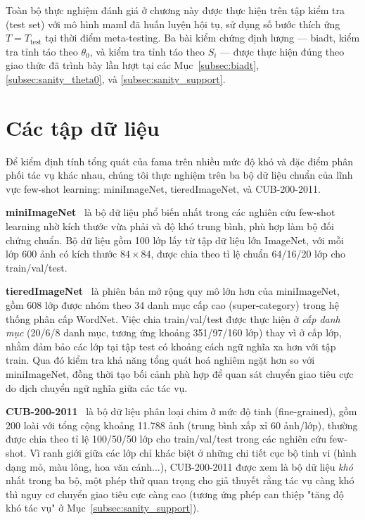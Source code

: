 Toàn bộ thực nghiệm đánh giá ở chương này được thực hiện trên tập kiểm tra (test set) với mô hình \acrshort{maml} đã huấn luyện hội tụ, sử dụng số bước thích ứng $T = T_{\text{test}}$ tại thời điểm meta-testing. Ba bài kiểm chứng định lượng — \acrshort{biadt}, kiểm tra tỉnh táo theo $\theta_0$, và kiểm tra tỉnh táo theo $S_i$ — được thực hiện đúng theo giao thức đã trình bày lần lượt tại các Mục~\ref{subsec:biadt}, \ref{subsec:sanity_theta0}, và \ref{subsec:sanity_support}.

\section{Các tập dữ liệu}
\label{sec:datasets}

Để kiểm định tính tổng quát của \acrshort{fama} trên nhiều mức độ khó và đặc điểm phân phối tác vụ khác nhau, chúng tôi thực nghiệm trên ba bộ dữ liệu chuẩn của lĩnh vực few-shot learning: miniImageNet, tieredImageNet, và CUB-200-2011.

\textbf{miniImageNet}~\cite{ravi2017optimization} là bộ dữ liệu phổ biến nhất trong các nghiên cứu few-shot learning nhờ kích thước vừa phải và độ khó trung bình, phù hợp làm bộ đối chứng chuẩn. Bộ dữ liệu gồm 100 lớp lấy từ tập dữ liệu lớn ImageNet, với mỗi lớp 600 ảnh có kích thước $84\times84$, được chia theo tỉ lệ chuẩn 64/16/20 lớp cho train/val/test.

\textbf{tieredImageNet}~\cite{ren2018meta} là phiên bản mở rộng quy mô lớn hơn của miniImageNet, gồm 608 lớp được nhóm theo 34 danh mục cấp cao (super-category) trong hệ thống phân cấp WordNet. Việc chia train/val/test được thực hiện ở \emph{cấp danh mục} (20/6/8 danh mục, tương ứng khoảng 351/97/160 lớp) thay vì ở cấp lớp, nhằm đảm bảo các lớp tại tập test có khoảng cách ngữ nghĩa xa hơn với tập train. Qua đó kiểm tra khả năng tổng quát hoá nghiêm ngặt hơn so với miniImageNet, đồng thời tạo bối cảnh phù hợp để quan sát chuyển giao tiêu cực do dịch chuyển ngữ nghĩa giữa các tác vụ.

\textbf{CUB-200-2011}~\cite{welinder2010caltech} là bộ dữ liệu phân loại chim ở mức độ tinh (fine-grained), gồm 200 loài với tổng cộng khoảng 11.788 ảnh (trung bình xấp xỉ 60 ảnh/lớp), thường được chia theo tỉ lệ 100/50/50 lớp cho train/val/test trong các nghiên cứu few-shot. Vì ranh giới giữa các lớp chỉ khác biệt ở những chi tiết cục bộ tinh vi (hình dạng mỏ, màu lông, hoa văn cánh...), CUB-200-2011 được xem là bộ dữ liệu \emph{khó} nhất trong ba bộ, một phép thử quan trọng cho giả thuyết rằng tác vụ càng khó thì nguy cơ chuyển giao tiêu cực càng cao (tương ứng phép can thiệp "tăng độ khó tác vụ" ở Mục~\ref{subsec:sanity_support}).

